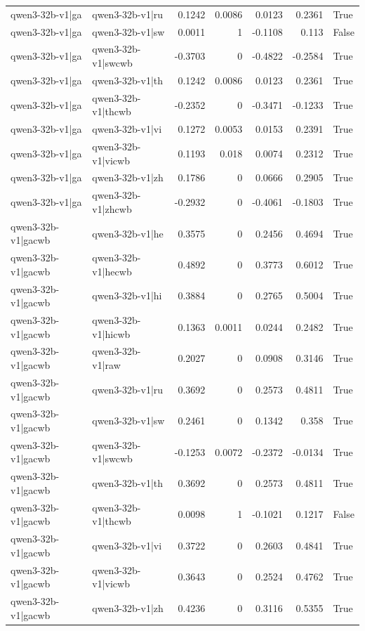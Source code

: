\begin{table}
\begin{tabular}{l l r r r r l}
qwen3-32b-v1|ga & qwen3-32b-v1|ru & 0.1242 & 0.0086 & 0.0123 & 0.2361 & True \\
qwen3-32b-v1|ga & qwen3-32b-v1|sw & 0.0011 & 1 & -0.1108 & 0.113 & False \\
qwen3-32b-v1|ga & qwen3-32b-v1|swcwb & -0.3703 & 0 & -0.4822 & -0.2584 & True \\
qwen3-32b-v1|ga & qwen3-32b-v1|th & 0.1242 & 0.0086 & 0.0123 & 0.2361 & True \\
qwen3-32b-v1|ga & qwen3-32b-v1|thcwb & -0.2352 & 0 & -0.3471 & -0.1233 & True \\
qwen3-32b-v1|ga & qwen3-32b-v1|vi & 0.1272 & 0.0053 & 0.0153 & 0.2391 & True \\
qwen3-32b-v1|ga & qwen3-32b-v1|vicwb & 0.1193 & 0.018 & 0.0074 & 0.2312 & True \\
qwen3-32b-v1|ga & qwen3-32b-v1|zh & 0.1786 & 0 & 0.0666 & 0.2905 & True \\
qwen3-32b-v1|ga & qwen3-32b-v1|zhcwb & -0.2932 & 0 & -0.4061 & -0.1803 & True \\
qwen3-32b-v1|gacwb & qwen3-32b-v1|he & 0.3575 & 0 & 0.2456 & 0.4694 & True \\
qwen3-32b-v1|gacwb & qwen3-32b-v1|hecwb & 0.4892 & 0 & 0.3773 & 0.6012 & True \\
qwen3-32b-v1|gacwb & qwen3-32b-v1|hi & 0.3884 & 0 & 0.2765 & 0.5004 & True \\
qwen3-32b-v1|gacwb & qwen3-32b-v1|hicwb & 0.1363 & 0.0011 & 0.0244 & 0.2482 & True \\
qwen3-32b-v1|gacwb & qwen3-32b-v1|raw & 0.2027 & 0 & 0.0908 & 0.3146 & True \\
qwen3-32b-v1|gacwb & qwen3-32b-v1|ru & 0.3692 & 0 & 0.2573 & 0.4811 & True \\
qwen3-32b-v1|gacwb & qwen3-32b-v1|sw & 0.2461 & 0 & 0.1342 & 0.358 & True \\
qwen3-32b-v1|gacwb & qwen3-32b-v1|swcwb & -0.1253 & 0.0072 & -0.2372 & -0.0134 & True \\
qwen3-32b-v1|gacwb & qwen3-32b-v1|th & 0.3692 & 0 & 0.2573 & 0.4811 & True \\
qwen3-32b-v1|gacwb & qwen3-32b-v1|thcwb & 0.0098 & 1 & -0.1021 & 0.1217 & False \\
qwen3-32b-v1|gacwb & qwen3-32b-v1|vi & 0.3722 & 0 & 0.2603 & 0.4841 & True \\
qwen3-32b-v1|gacwb & qwen3-32b-v1|vicwb & 0.3643 & 0 & 0.2524 & 0.4762 & True \\
qwen3-32b-v1|gacwb & qwen3-32b-v1|zh & 0.4236 & 0 & 0.3116 & 0.5355 & True \\

\end{tabular}
\end{table}
